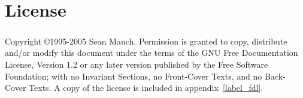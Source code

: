 \chapter{License}


\paragraph{}
Copyright \copyright 1995-2005 Sean Mauch.  Permission is granted to
copy, distribute and/or modify this document under the terms of the
GNU Free Documentation License, Version 1.2 or any later version
published by the Free Software Foundation; with no Invariant Sections,
no Front-Cover Texts, and no Back-Cover Texts.  A copy of the license
is included in appendix~\ref{label_fdl}.

\raggedbottom

